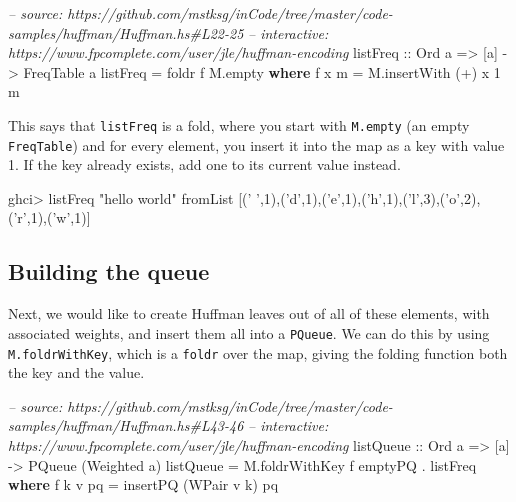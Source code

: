 \documentclass[]{article}
\newenvironment{Shaded}{}{}
\newcommand{\KeywordTok}[1]{\textcolor[rgb]{0.00,0.44,0.13}{\textbf{{#1}}}}
\newcommand{\DataTypeTok}[1]{\textcolor[rgb]{0.56,0.13,0.00}{{#1}}}
\newcommand{\DecValTok}[1]{\textcolor[rgb]{0.25,0.63,0.44}{{#1}}}
\newcommand{\CharTok}[1]{\textcolor[rgb]{0.25,0.44,0.63}{{#1}}}
\newcommand{\StringTok}[1]{\textcolor[rgb]{0.25,0.44,0.63}{{#1}}}
\newcommand{\CommentTok}[1]{\textcolor[rgb]{0.38,0.63,0.69}{\textit{{#1}}}}
\newcommand{\OtherTok}[1]{\textcolor[rgb]{0.00,0.44,0.13}{{#1}}}
\newcommand{\FunctionTok}[1]{\textcolor[rgb]{0.02,0.16,0.49}{{#1}}}
\newcommand{\NormalTok}[1]{{#1}}
\begin{document}
\begin{Shaded}
\begin{Highlighting}[]
\CommentTok{-- source: https://github.com/mstksg/inCode/tree/master/code-samples/huffman/Huffman.hs#L22-25}
\CommentTok{-- interactive: https://www.fpcomplete.com/user/jle/huffman-encoding}
\OtherTok{listFreq ::} \DataTypeTok{Ord} \NormalTok{a }\OtherTok{=>} \NormalTok{[a] }\OtherTok{->} \DataTypeTok{FreqTable} \NormalTok{a}
\NormalTok{listFreq }\FunctionTok{=} \NormalTok{foldr f M.empty}
  \KeywordTok{where}
    \NormalTok{f x m }\FunctionTok{=} \NormalTok{M.insertWith (}\FunctionTok{+}\NormalTok{) x }\DecValTok{1} \NormalTok{m}
\end{Highlighting}
\end{Shaded}

This says that \texttt{listFreq} is a fold, where you start with
\texttt{M.empty} (an empty \texttt{FreqTable}) and for every element,
you insert it into the map as a key with value 1. If the key already
exists, add one to its current value instead.

\begin{Shaded}
\begin{Highlighting}[]
\NormalTok{ghci}\FunctionTok{>} \NormalTok{listFreq }\StringTok{"hello world"}
\NormalTok{fromList [(}\CharTok{' '}\NormalTok{,}\DecValTok{1}\NormalTok{),(}\CharTok{'d'}\NormalTok{,}\DecValTok{1}\NormalTok{),(}\CharTok{'e'}\NormalTok{,}\DecValTok{1}\NormalTok{),(}\CharTok{'h'}\NormalTok{,}\DecValTok{1}\NormalTok{),(}\CharTok{'l'}\NormalTok{,}\DecValTok{3}\NormalTok{),(}\CharTok{'o'}\NormalTok{,}\DecValTok{2}\NormalTok{),(}\CharTok{'r'}\NormalTok{,}\DecValTok{1}\NormalTok{),(}\CharTok{'w'}\NormalTok{,}\DecValTok{1}\NormalTok{)]}
\end{Highlighting}
\end{Shaded}

\subsection{Building the queue}\label{building-the-queue}

Next, we would like to create Huffman leaves out of all of these
elements, with associated weights, and insert them all into a
\texttt{PQueue}. We can do this by using \texttt{M.foldrWithKey}, which
is a \texttt{foldr} over the map, giving the folding function both the
key and the value.

\begin{Shaded}
\begin{Highlighting}[]
\CommentTok{-- source: https://github.com/mstksg/inCode/tree/master/code-samples/huffman/Huffman.hs#L43-46}
\CommentTok{-- interactive: https://www.fpcomplete.com/user/jle/huffman-encoding}
\OtherTok{listQueue ::} \DataTypeTok{Ord} \NormalTok{a }\OtherTok{=>} \NormalTok{[a] }\OtherTok{->} \DataTypeTok{PQueue} \NormalTok{(}\DataTypeTok{Weighted} \NormalTok{a)}
\NormalTok{listQueue }\FunctionTok{=} \NormalTok{M.foldrWithKey f emptyPQ }\FunctionTok{.} \NormalTok{listFreq}
  \KeywordTok{where}
    \NormalTok{f k v pq }\FunctionTok{=} \NormalTok{insertPQ (}\DataTypeTok{WPair} \NormalTok{v k) pq}
\end{Highlighting}
\end{Shaded}
\end{document}
